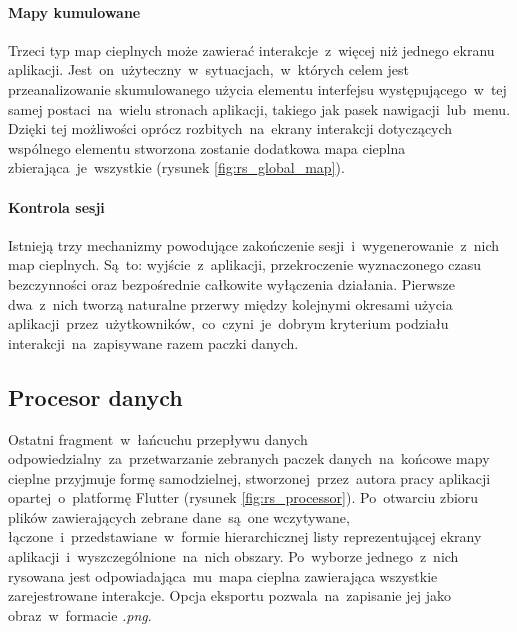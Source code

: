 \bigskip
{}

\paragraph{Mapy kumulowane} Trzeci typ map cieplnych może zawierać interakcje~z~więcej niż jednego ekranu aplikacji. Jest~on~użyteczny~w~sytuacjach,~w~których celem jest przeanalizowanie skumulowanego użycia elementu interfejsu występującego~w~tej samej postaci~na~wielu stronach aplikacji, takiego jak pasek nawigacji~lub~menu. Dzięki tej możliwości oprócz rozbitych~na~ekrany interakcji dotyczących wspólnego elementu stworzona zostanie dodatkowa mapa cieplna zbierająca~je~wszystkie (rysunek \ref{fig:rs_global_map}).

\bigskip
{}

\paragraph{Kontrola sesji}
Istnieją trzy mechanizmy powodujące zakończenie sesji~i~wygenerowanie~z~nich map cieplnych. Są~to: wyjście~z~aplikacji, przekroczenie wyznaczonego czasu bezczynności oraz bezpośrednie całkowite wyłączenia działania. Pierwsze dwa~z~nich tworzą naturalne przerwy między kolejnymi okresami użycia aplikacji~przez~użytkowników,~co~czyni~je~dobrym kryterium podziału interakcji~na~zapisywane razem paczki danych.

\newcommand*\circled[1]{\tikz[baseline=(char.base)]{\node[shape=circle,draw,inner sep=1.2pt] (char) {#1};}}

\subsection{Procesor danych}
Ostatni fragment~w~łańcuchu przepływu danych odpowiedzialny~za~przetwarzanie zebranych paczek danych~na~końcowe mapy cieplne przyjmuje formę samodzielnej, stworzonej~przez~autora pracy aplikacji opartej~o~platformę Flutter (rysunek \ref{fig:rs_processor}). Po~otwarciu zbioru plików zawierających zebrane dane~są~one wczytywane, łączone~i~przedstawiane~w~formie hierarchicznej listy reprezentującej ekrany aplikacji~i~wyszczególnione~na~nich obszary. Po~wyborze jednego~z~nich rysowana jest odpowiadająca~mu~mapa cieplna zawierająca wszystkie zarejestrowane interakcje. Opcja eksportu pozwala~na~zapisanie jej jako obraz~w~formacie \textit{.png}.

